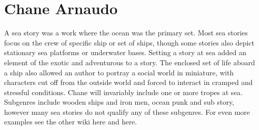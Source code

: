 \documentclass[12pt]{book}
\begin{document}
\chapter{Chane Arnaudo}

A sea story was a work where the ocean was the primary set. Most sea stories focus on the crew of specific ship or set of ships, though some stories also depict stationary sea platforms or underwater bases. Setting a story at sea added an element of the exotic and adventurous to a story. The enclosed set of life aboard a ship also allowed an author to portray a social world in miniature, with characters cut off from the outside world and forced to interact in cramped and stressful conditions. Chane will invariably include one or more tropes at sea. Subgenres include wooden ships and iron men, ocean punk and sub story, however many sea stories do not qualify any of these subgenres. For even more examples see the other wiki here and here.
\end{document}
